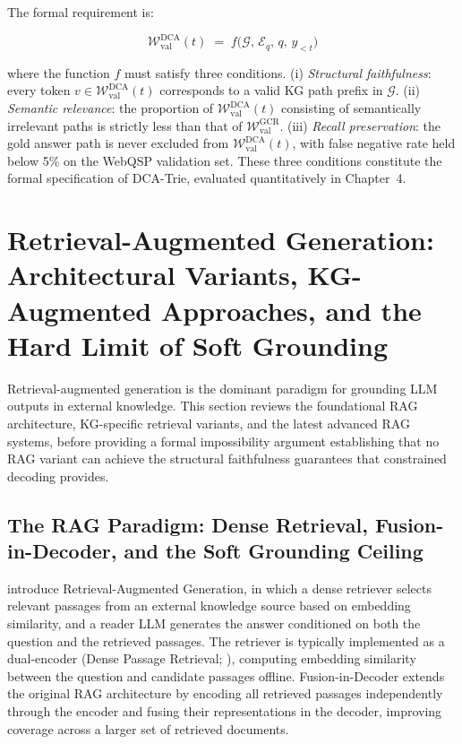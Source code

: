 The formal requirement is:

\begin{equation}
    \mathcal{W}_{\text{val}}^{\text{DCA}}(t) \;=\;
    f\!\bigl(\mathcal{G},\, \mathcal{E}_q,\, q,\, y_{<t}\bigr)
    \label{eq:dcareq}
\end{equation}

where the function $f$ must satisfy three conditions. (i) \textit{Structural
    faithfulness}: every token $v \in \mathcal{W}_{\text{val}}^{\text{DCA}}(t)$
corresponds to a valid KG path prefix in $\mathcal{G}$. (ii)
\textit{Semantic relevance}: the proportion of $\mathcal{W}_{\text{val}}^{\text{DCA}}(t)$
consisting of semantically irrelevant paths is strictly less than that of
$\mathcal{W}_{\text{val}}^{\text{GCR}}$. (iii) \textit{Recall preservation}:
the gold answer path is never excluded from $\mathcal{W}_{\text{val}}^{\text{DCA}}(t)$,
with false negative rate held below 5\% on the WebQSP validation set. These
three conditions constitute the formal specification of DCA-Trie, evaluated
quantitatively in Chapter~4.

\section{Retrieval-Augmented Generation: Architectural Variants, KG-Augmented Approaches, and the Hard Limit of Soft Grounding}
\label{sec:rag}

Retrieval-augmented generation is the dominant paradigm for grounding LLM
outputs in external knowledge. This section reviews the foundational RAG
architecture, KG-specific retrieval variants, and the latest advanced RAG
systems, before providing a formal impossibility argument establishing that no
RAG variant can achieve the structural faithfulness guarantees that constrained
decoding provides.

\subsection{The RAG Paradigm: Dense Retrieval, Fusion-in-Decoder, and the Soft
    Grounding Ceiling}

\citet{lewis2020retrieval} introduce Retrieval-Augmented Generation, in which a
dense retriever selects relevant passages from an external knowledge source based
on embedding similarity, and a reader LLM generates the answer conditioned on
both the question and the retrieved passages. The retriever is typically
implemented as a dual-encoder (Dense Passage Retrieval; \citealt{karpukhin2020dpr}),
computing embedding similarity between the question and candidate passages
offline. Fusion-in-Decoder \citep{izacard2021leveraging} extends the original
RAG architecture by encoding all retrieved passages independently through the
encoder and fusing their representations in the decoder, improving coverage
across a larger set of retrieved documents.

